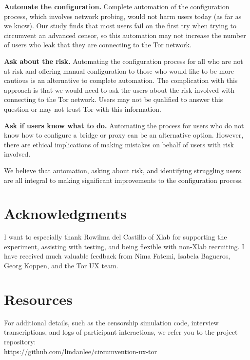 \documentclass[USenglish,oneside,twocolumn]{article}
\begin{document}
\begin{description}
\item{\bfseries Automate the configuration.} Complete automation of the configuration process, which involves network probing, would not harm users today (as far as we know). Our study finds that most users fail on the first try when trying to circumvent an advanced censor, so this automation may not increase the number of users who leak that they are connecting to the Tor network. 
\item{\bfseries Ask about the risk.} Automating the configuration process for all who are not at risk and offering manual configuration to those who would like to be more cautious is an alternative to complete automation. The complication with this approach is that we would need to ask the users about the risk involved with connecting to the Tor network. Users may not be qualified to answer this question or may not trust Tor with this information. 
\item{\bfseries Ask if users know what to do.} Automating the process for users who do not know how to configure a bridge or proxy can be an alternative option. However, there are ethical implications of making mistakes on behalf of users with risk involved. 
\end{description}

We believe that automation, asking about risk, and identifying struggling users are all integral to making significant improvements to the configuration process. 

\section {Acknowledgments}
I want to especially thank Rowilma del Castillo of Xlab for supporting the experiment, assisting with testing, and being flexible with non-Xlab recruiting. I have received much valuable feedback from Nima Fatemi, Isabela Bagueros, Georg Koppen, and the Tor UX team. 

\section {Resources} 
For additional details, such as the censorship simulation code, interview transcriptions, and logs of participant interactions, we refer you to the project repository: \\

\noindent https://github.com/lindanlee/circumvention-ux-tor
\end{document}
